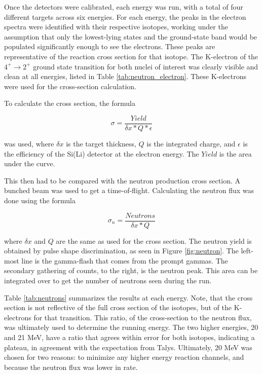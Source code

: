 Once the detectors were calibrated, each energy was run, with a total of four different targets across six energies. For each energy, the peaks in the electron spectra were identified with their respective isotopes, working under the assumption that only the lowest-lying states and the ground-state band would be populated significantly enough to see the electrons. These peaks are representative of the reaction cross section for that isotope. The K-electron of the $4^+\rightarrow2^+$ ground state transition for both nuclei of interest was clearly visible and clean at all energies, listed in Table \ref{tab:neutron_electron}. These K-electrons were used for the cross-section calculation.



To calculate the cross section, the formula

\begin{equation}
    \sigma=\frac{Yield}{\delta x*Q*\epsilon}
    \label{eq:xs}
\end{equation}

was used, where $\delta x$ is the target thickness, $Q$ is the integrated charge, and $\epsilon$ is the efficiency of the Si(Li) detector at the electron energy. The $Yield$ is the area under the curve.

This then had to be compared with the neutron production cross section. A bunched beam was used to get a time-of-flight. Calculating the neutron flux was done using the formula

\begin{equation}
    \sigma_n = \frac{Neutrons}{\delta x*Q}
\end{equation}

where $\delta x$ and $Q$ are the same as used for the cross section. The neutron yield is obtained by pulse shape discrimination, as seen in Figure \ref{fig:neutron}. The left-most line is the gamma-flash that comes from the prompt gammas. The secondary gathering of counts, to the right, is the neutron peak. This area can be integrated over to get the number of neutrons seen during the run.

Table \ref{tab:neutrons} summarizes the results at each energy. Note, that the cross section is not reflective of the full cross section of the isotopes, but of the K-electrons for that transition. This ratio, of the cross-section to the neutron flux, was ultimately used to determine the running energy. The two higher energies, 20 and 21 MeV, have a ratio that agrees within error for both isotopes, indicating a plateau, in agreement with the expectation from Talys. Ultimately, 20 MeV was chosen for two reasons: to minimize any higher energy reaction channels, and because the neutron flux was lower in rate.

